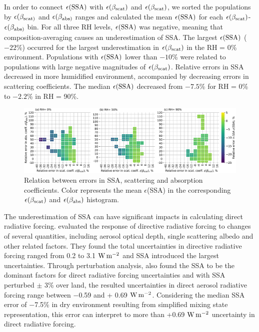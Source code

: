 \documentclass[edeposit,fullpage]{uiucthesis2009}
\makeatletter
\DeclareRobustCommand*\unit[1]
 {\ensuremath{%
   {\thinmuskip3mu\relax
    \def\mu{\text{\textmu}}\def~{\,}%
    \ifx\f@series\testbx\mathbf{#1}\else\mathrm{#1}\fi}}}
\makeatother
\begin{document}
In order to connect $\epsilon(\rm SSA)$ with $\epsilon(\beta_{\rm
  scat})$ and $\epsilon(\beta_{\rm scat})$, we sorted the populations
by $\epsilon(\beta_{\rm scat)}$ and $\epsilon(\beta_{\rm abs)}$ ranges
and calculated the mean $\epsilon(\rm SSA)$ for each
$\epsilon(\beta_{\rm scat})$-$\epsilon(\beta_{\rm abs)}$ bin. For all
three RH levels, $\epsilon(\rm SSA)$ was negative, meaning that
composition-averaging causes an underestimation of SSA. The largest
$\epsilon(\rm SSA)$ ($-22$\%) occurred for the largest underestimation
in $\epsilon(\beta_{\rm scat})$ in the RH = 0\%
environment. Populations with $\epsilon(\rm SSA)$ lower than $-10$\%
were related to populations with large negative magnitudes of
$\epsilon(\beta_{\rm scat})$. Relative errors in SSA decreased in more
humidified environment, accompanied by decreasing errors in scattering
coefficients. The median $\epsilon(\rm SSA)$ decreased from $-7.5$\%
for RH = 0\% to $-2.2$\% in RH = 90\%.

\begin{figure}
	\centering
	\includegraphics[scale=0.50]{chap4_figs/fig10.pdf}
	\caption{Relation between errors in SSA, scattering and
          absorption coefficients. Color represents the mean
          $\epsilon$(SSA) in the corresponding $\epsilon(\beta_{\rm
            scat})$ and $\epsilon(\beta_{\rm \rm abs})$ histogram.}
	\label{fig12:ssa-err}
\end{figure}

The underestimation of SSA can have significant impacts in calculating
direct radiative forcing. \citet{mccomiskey2008direct} evaluated the
response of directive radiative forcing to changes of several
quantities, including aerosol optical depth, single
scattering albedo and other related factors. They found the total
uncertainties in directive radiative forcing ranged from 0.2 to 3.1
\unit{W\,m^{-2}} and SSA introduced the largest uncertainties. Through
perturbation analysis, \citet{loeb2010direct} also found the SSA to be
the dominant factors for direct radiative forcing uncertainties and
with SSA perturbed $\pm$ 3\% over land, the
resulted uncertainties in direct aerosol radiative forcing range
between $-$0.59 and + 0.69 \unit{W\,m^{-2}}. Considering the median SSA error of
$-$7.5\% in dry environment resulting from simplified mixing state representation, this error 
can interpret to more than +0.69 \unit{W\,m^{-2}} uncertainty in direct radiative forcing.
\end{document}
